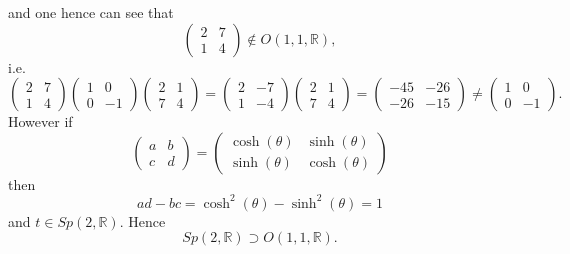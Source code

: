 \documentclass[aps,preprint]{revtex4}
\begin{document}
and one hence can see that 
\begin{equation}
\left( 
\begin{array}{cc}
2 & 7 \\ 
1 & 4%
\end{array}%
\right) \notin O\left( 1,1,\mathbb{R}\right) ,
\end{equation}%
i.e. 
\begin{equation}
\left( 
\begin{array}{cc}
2 & 7 \\ 
1 & 4%
\end{array}%
\right) \left( 
\begin{array}{cc}
1 & 0 \\ 
0 & -1%
\end{array}%
\right) \left( 
\begin{array}{cc}
2 & 1 \\ 
7 & 4%
\end{array}%
\right) =\left( 
\begin{array}{cc}
2 & -7 \\ 
1 & -4%
\end{array}%
\right) \left( 
\begin{array}{cc}
2 & 1 \\ 
7 & 4%
\end{array}%
\right) =\left( 
\begin{array}{cc}
-45 & -26 \\ 
-26 & -15%
\end{array}%
\right) \neq \left( 
\begin{array}{cc}
1 & 0 \\ 
0 & -1%
\end{array}%
\right) .
\end{equation}%
However if 
\begin{equation}
\left( 
\begin{array}{cc}
a & b \\ 
c & d%
\end{array}%
\right) =\left( 
\begin{array}{cc}
\cosh \left( \theta \right) & \sinh \left( \theta \right) \\ 
\sinh \left( \theta \right) & \cosh \left( \theta \right)%
\end{array}%
\right)
\end{equation}%
then 
\begin{equation}
ad-bc=\cosh ^{2}\left( \theta \right) -\sinh ^{2}\left( \theta \right) =1
\end{equation}%
and $t\in Sp\left( 2,\mathbb{R}\right) .$ Hence 
\begin{equation}
Sp\left( 2,\mathbb{R}\right) \supset O\left( 1,1,\mathbb{R}\right) .
\end{equation}
\end{document}
